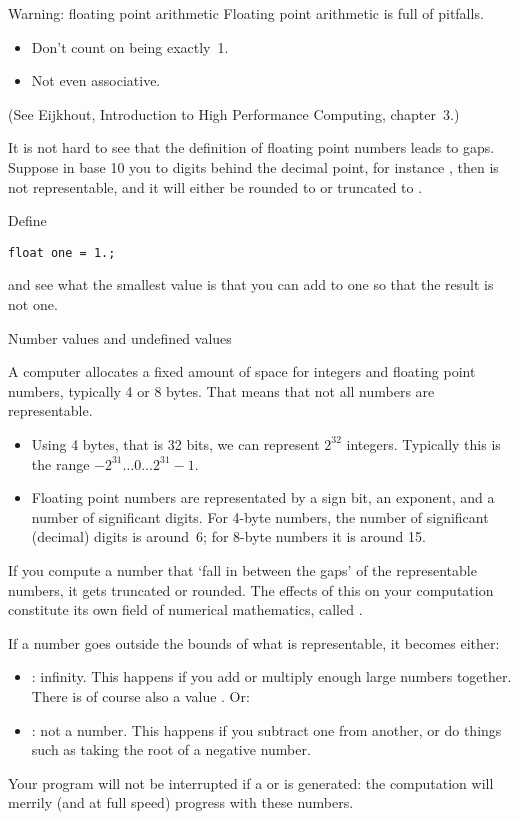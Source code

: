 \begin{block}{Warning: floating point arithmetic}
  \label{sl:float-arith}
  Floating point arithmetic is full of pitfalls.
  \begin{itemize}
  \item Don't count on  being exactly~1.
  \item Not even associative.
  \end{itemize}
  (See Eijkhout, Introduction to High Performance Computing, chapter~3.)
\end{block}

\begin{exercise}
  \label{ex:macheps}
  It is not hard to see that the definition of floating point numbers
  leads to gaps. Suppose in base 10 you to digits behind the decimal
  point, for instance , then  is not representable,
  and it will either be rounded to  or truncated to .

  Define 
\begin{verbatim}
float one = 1.;
\end{verbatim}
  and see what the smallest value  is that you can add to
  one so that the result is not one.
\end{exercise}

 {Number values and undefined values}
\label{sec:naninf}

A computer allocates a fixed amount of space for integers and floating
point numbers, typically 4 or 8 bytes. That means that not all numbers
are representable.
\begin{itemize}
\item Using 4 bytes, that is 32 bits, we can represent $2^{32}$
  integers. Typically this is the range $-2^{31}\ldots 0 \ldots
  2^{31}-1$.
\item Floating point numbers are representated by a sign bit, an
  exponent, and a number of significant digits.
  For 4-byte numbers, the number of significant (decimal) digits is
  around~6; for 8-byte numbers it is around 15.
\end{itemize}

If you compute a number that `fall in between the gaps' of the
representable numbers, it gets truncated or rounded. The effects of
this on your computation constitute its own field of numerical
mathematics, called .

If a number goes outside the bounds of what is representable, it
becomes either:
\begin{itemize}
\item {}: infinity. This happens if you add or multiply
  enough large numbers together. There is of course also a value
  . Or:
\item {}: not a number. This happens if you subtract
  one  from another, or do things such as taking the
  root of a negative number.
\end{itemize}
Your program will not be interrupted if a  or  is
generated: the computation will merrily (and at full speed) progress with these numbers.

